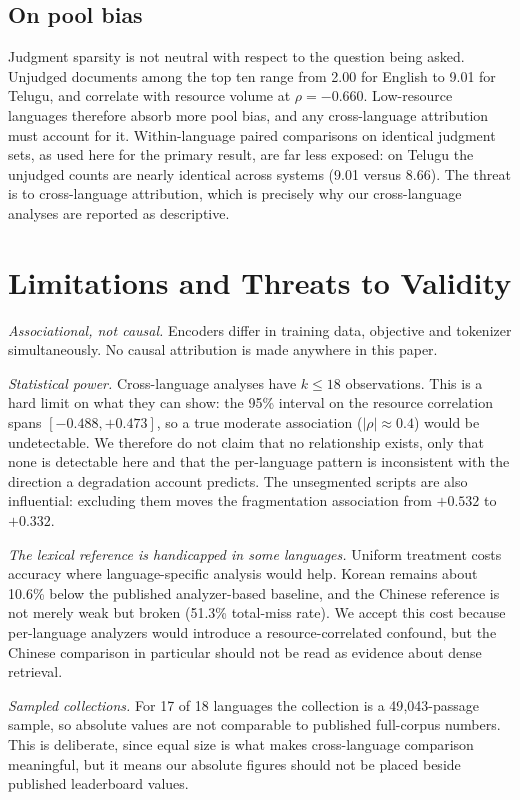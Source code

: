 \documentclass{ijimai_article}
\begin{document}
\subsection{On pool bias}
Judgment sparsity is not neutral with respect to the question being asked.
Unjudged documents among the top ten range from 2.00 for English to 9.01 for
Telugu, and correlate with resource volume at $\rho = -0.660$. Low-resource
languages therefore absorb more pool bias, and any cross-language attribution must
account for it. Within-language paired comparisons on identical judgment sets, as
used here for the primary result, are far less exposed: on Telugu the unjudged
counts are nearly identical across systems (9.01 versus 8.66). The threat is to
cross-language attribution, which is precisely why our cross-language analyses are
reported as descriptive.

\section{Limitations and Threats to Validity}

\emph{Associational, not causal.} Encoders differ in training data, objective and
tokenizer simultaneously. No causal attribution is made anywhere in this paper.

\emph{Statistical power.} Cross-language analyses have $k \le 18$ observations. This
is a hard limit on what they can show: the 95\% interval on the resource correlation
spans $[-0.488, +0.473]$, so a true moderate association ($|\rho| \approx 0.4$) would
be undetectable. We therefore do not claim that no relationship exists, only that none
is detectable here and that the per-language pattern is inconsistent with the
direction a degradation account predicts. The unsegmented scripts are also
influential: excluding them moves the fragmentation association from $+0.532$ to
$+0.332$.

\emph{The lexical reference is handicapped in some languages.} Uniform treatment
costs accuracy where language-specific analysis would help. Korean remains about
10.6\% below the published analyzer-based baseline, and the Chinese reference is
not merely weak but broken (51.3\% total-miss rate). We accept this cost because
per-language analyzers would introduce a resource-correlated confound, but the
Chinese comparison in particular should not be read as evidence about dense
retrieval.

\emph{Sampled collections.} For 17 of 18 languages the collection is a
49{,}043-passage sample, so absolute values are not comparable to published
full-corpus numbers. This is deliberate, since equal size is what makes cross-language
comparison meaningful, but it means our absolute figures should not be placed
beside published leaderboard values.
\end{document}
